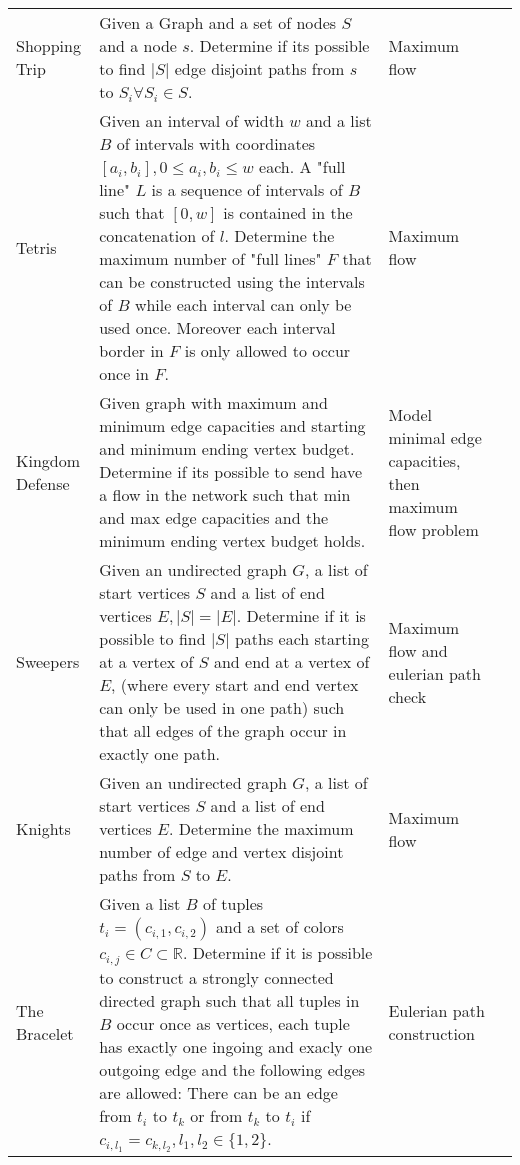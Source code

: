 \documentclass[a4paper, 10pt]{article}
\begin{document}
\begin{longtable}{ L{2cm} L{8cm} L{4cm} r}
        Shopping Trip 
        & Given a Graph and a set of nodes $S$ and a node $s$. 
            Determine if its possible to find $|S|$ edge disjoint paths from $s$ to $S_i \forall S_i \in S$. 
        & Maximum flow &  \pageref{sec:shopping_trip} \\

        Tetris 
        & Given an interval of width $w$ and a list $B$ of intervals with coordinates $[a_i,b_i], 0\leq a_i,b_i \leq w$ each.
            A "full line" $L$ is a sequence of intervals of $B$ such that $[0,w]$ is contained in the concatenation of $l$.
            Determine the maximum number of "full lines" $F$ that can be constructed using the intervals of $B$ while each interval
            can only be used once. Moreover each interval border in $F$ is only allowed to occur once in $F$.
            & Maximum flow &  \pageref{sec:tetris} \\

        Kingdom Defense 
        & Given graph with maximum and minimum edge capacities and starting and minimum ending vertex budget.
            Determine if its possible to send have a flow in the network such that min and max edge capacities and the minimum ending vertex budget holds.            
        & Model minimal edge capacities, then maximum flow problem &  \pageref{sec:kingdom_defense} \\

        Sweepers 
        & Given an undirected graph $G$, a list of start vertices $S$ and a list of end vertices $E, |S|=|E|$.
            Determine if it is possible to find $|S|$ paths each starting at a vertex of $S$ and end at a vertex of $E$, 
            (where every start and end vertex can only be used in one path) such that all edges of the graph occur in exactly one path.   
        & Maximum flow and eulerian path check &  \pageref{sec:sweepers} \\

        Knights 
        & Given an undirected graph $G$, a list of start vertices $S$ and a list of end vertices $E$.
            Determine the maximum number of edge and vertex disjoint paths from $S$ to  $E$.
        & Maximum flow &  \pageref{sec:knights} \\

        The Bracelet 
        & Given a list $B$ of tuples $t_i = (c_{i,1}, c_{i,2})$ and a set of colors $c_{i,j}\in C\subset \mathbb{R}$.
            Determine if it is possible to construct a strongly connected directed graph such that all tuples in $B$ occur once as vertices,
            each tuple has exactly one ingoing and exacly one outgoing edge and the following edges are allowed: 
            There can be an edge from $t_i$ to $t_k$ or from $t_k$ to $t_i$ if $c_{i,l_1} = c_{k,l_2}, l_1,l_2\in\{1,2\}$.   
        & Eulerian path construction &  \pageref{sec:the_bracelet} \\


\end{longtable}
\end{document}
